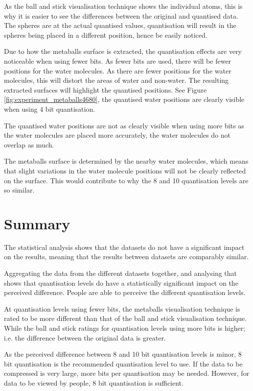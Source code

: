 As the ball and stick visualisation technique shows the individual atoms, this
is why it is easier to see the differences between the original and quantised
data. The spheres are at the actual quantised values, quantisation will result
in the spheres being placed in a different position, hence be easily noticed.

Due to how the metaballs surface is extracted, the quantisation effects are
very noticeable when using fewer bits. As fewer bits are used, there will be
fewer positions for the water molecules. As there are fewer positions for the
water molecules, this will distort the areas of water and non-water. The
resulting extracted surfaces will highlight the quantised positions. See Figure
\ref{fig:experiment_metaballs4680}, the quantised water positions are clearly
visible when using 4 bit quantisation.

The quantised water positions are not as clearly visible when using more bits
as the water molecules are placed more accurately, the water molecules do not
overlap as much.

The metaballs surface is determined by the nearby water molecules, which means
that slight variations in the water molecule positions will not be clearly
reflected on the surface. This would contribute to why the 8 and 10
quantisation levels are so similar.



\section{Summary}
\label{sec:results_summary}

The statistical analysis shows that the datasets do not have a significant
impact on the results, meaning that the results between datasets are comparably
similar.

Aggregating the data from the different datasets together, and analysing that
shows that quantisation levels do have a statistically significant impact on
the perceived difference. People are able to perceive the different
quantisation levels.

At quantisation levels using fewer bits, the metaballs visualisation technique
is rated to be more different than that of the ball and stick visualisation
technique. While the ball and stick ratings for quantisation levels using more
bits is higher; i.e. the difference between the original data is greater.

As the perceived difference between 8 and 10 bit quantisation levels is minor,
8 bit quantisation is the recommended quantisation level to use. If the data to
be compressed is very large, more bits per quantisation may be needed. However,
for data to be viewed by people, 8 bit quantisation is sufficient.



